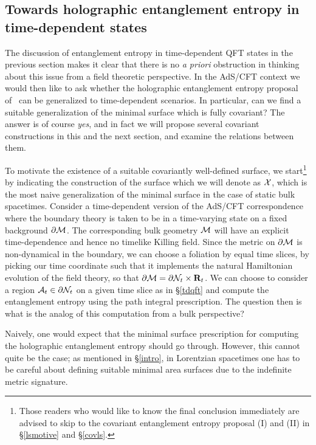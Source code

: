 \documentclass[12pt]{article}
\def\sec#1{\S \;\ref{#1}}
\def\p{\partial}
\def\CA{{\cal A}}
\def\CX{{\cal X}}
\def\R{{\bf R}}
\def\p{\partial}
\def\p{\partial}
\def\bulk{{\cal M}}
\def\bdy{\p{\cal M}}
\def\bdys{\p{\cal N}}
\def\Xms{\CX}
\def\rA{\CA}
\begin{document}
\subsection{Towards holographic entanglement entropy in time-dependent states}
\label{holtimedep}


The discussion of entanglement entropy in time-dependent  QFT states
 in the previous section makes it clear that there is no
  {\it a priori} obstruction in thinking about this issue from a
   field theoretic perspective. In the AdS/CFT context we would then like
    to ask whether the holographic entanglement entropy proposal of~\cite{Ryu:2006bv,Ryu:2006ef}  can be generalized to time-dependent scenarios.  In particular, can we find a suitable generalization of the minimal surface which is fully covariant?  The answer is of course {\it yes}, and
    in fact we will propose several covariant constructions in this and the next section, and
    examine the relations between them.

To motivate the existence of a suitable covariantly well-defined
surface, we start\footnote{Those readers who
 would like to know the final conclusion immediately are advised to skip to the covariant
 entanglement entropy proposal (I) and (II) in
 \sec{lsmotive} and \sec{covls}.}
  by indicating the construction of the surface which we will denote as  $\Xms$,
 which is the most naive generalization of the minimal surface in the case of static bulk spacetimes.
  Consider a time-dependent  version of the AdS/CFT correspondence where the boundary
  theory is taken to be in a time-varying state on a  fixed background $\bdy$. The corresponding
  bulk geometry $\bulk$ will have an explicit time-dependence
   and hence no timelike Killing field. Since the metric on $\bdy$ is non-dynamical in the boundary,
   we can choose a foliation by equal time slices, by picking our time coordinate such that it
   implements the natural Hamiltonian evolution of the field theory, so that
 $\bdy =  \bdys_t \times \R_t$. We can choose to consider a region $\rA_t \in \bdys_t$ on a given
  time slice as in \sec{tdqft}  and compute the entanglement entropy using the path integral prescription.
   The question then is what is the analog of this computation from a bulk perspective?

Naively, one would expect that the minimal surface prescription for computing the
 holographic entanglement entropy should go through. However, this cannot quite be
 the case; as mentioned in \sec{intro}, in Lorentzian spacetimes one has to be careful about defining suitable  minimal area surfaces due to the indefinite metric signature.
\end{document}
